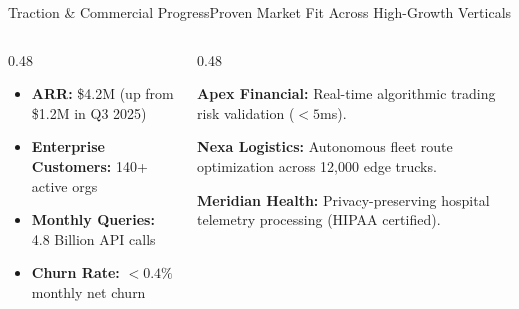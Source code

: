 \documentclass[aspectratio=169,10pt]{beamer}
\begin{document}
\begin{frame}{Traction \& Commercial Progress}{Proven Market Fit Across High-Growth Verticals}
  \begin{columns}[c]
    \begin{column}{0.48\textwidth}
      \begin{tcolorbox}[cyancard, title={\small\faChartLine\ Growth Trajectory}]
        \small
        \begin{itemize}
          \item \textbf{ARR:} \$4.2M (up from \$1.2M in Q3 2025)
          \item \textbf{Enterprise Customers:} 140+ active orgs
          \item \textbf{Monthly Queries:} 4.8 Billion API calls
          \item \textbf{Churn Rate:} $< 0.4\%$ monthly net churn
        \end{itemize}
      \end{tcolorbox}
    \end{column}
    
    \begin{column}{0.48\textwidth}
      \begin{tcolorbox}[darkcard, title={\small\faGlobe\ Strategic Customers}]
        \scriptsize
        \textbf{Apex Financial:} Real-time algorithmic trading risk validation ($< 5$ms).
        \par\vspace*{0.15cm}
        \textbf{Nexa Logistics:} Autonomous fleet route optimization across 12,000 edge trucks.
        \par\vspace*{0.15cm}
        \textbf{Meridian Health:} Privacy-preserving hospital telemetry processing (HIPAA certified).
      \end{tcolorbox}
    \end{column}
  \end{columns}
\end{frame}
\end{document}
